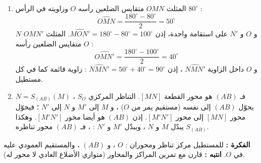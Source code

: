 \documentclass[12pt,a4paper]{article}
\newcommand{\cm}{\,\mathrm{cm}}
\begin{document}
\begin{corr}[title={تركيب : دائرة ومستطيل}, stars=3, source={Axiomaths}]
\begin{enumerate}[itemsep=14pt]
\begin{prop}
  رباعي قطراه لهما نفس المنتصف هو متوازي أضلاع ؛ وإذا كان قطراه متقايسين فهو .
  \end{prop}
  قطرا $MNM'N'$ هما $[MM']$ و $[NN']$. $O$ منتصف $[MM']$ لأن $M'=S_O(M)$ ، و $O$ منتصف $[NN']$ لأن $N'=S_O(N)$ : نفس المنتصف.
  و $MM'=2\times3=6\cm=NN'$ (قطران للدائرة) : القطران متقايسان. إذن $MNM'N'$ مستطيل.
  \item المثلث $OMN$ متقايس الضلعين رأسه $O$ وزاويته في الرأس $80^\circ$ :
  \[\widehat{OMN}=\dfrac{180^\circ-80^\circ}{2}=50^\circ\]
  $N$ و $O$ و $N'$ على استقامة واحدة، إذن $\widehat{MON'}=180^\circ-80^\circ=100^\circ$. المثلث $OMN'$ متقايس الضلعين رأسه $O$ :
  \[\widehat{OMN'}=\dfrac{180^\circ-100^\circ}{2}=40^\circ\]
  و $O$ داخل الزاوية $\widehat{NMN'}$ ، إذن $\widehat{NMN'}=50^\circ+40^\circ=90^\circ$ : زاوية قائمة كما في كل مستطيل.
  \item $N=S_{(AB)}(M)$ ، فـ $(AB)$ هو محور القطعة $[MN]$.
  التناظر المركزي $S_O$ يحوّل $(AB)$ إلى نفسه (مستقيم يمر من $O$) ، و $M$ إلى $M'$ و $N$ إلى $N'$ ؛ فيحوّل محور $[MN]$ إلى محور $[M'N']$. إذن $(AB)$ هو أيضا محور $[M'N']$.
  وهكذا $S_{(AB)}$ يبدّل $M$ و $N$ ، ويبدّل $M'$ و $N'$ : ، فـ $(AB)$ محور تناظره.
\end{enumerate}
\textbf{الفكرة :} للمستطيل مركز تناظر ومحوران : $O$ ، و $(AB)$ ، والمستقيم العمودي عليه في $O$. \quad \textbf{انتبه :} قارن مع تمرين المراكز والمحاور (متوازي الأضلاع العادي لا محور له).
\end{corr}
\end{document}
